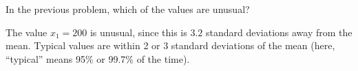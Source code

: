 \documentclass[answers,11pt]{exam}
\begin{document}
\begin{questions}

\question In the previous problem, which of the values are unusual?

\begin{solution}
The value $x_1 = 200$ is unusual, since this is $3.2$ standard deviations
away from the mean.  Typical values are within 2 or 3 standard deviations of
the mean (here, ``typical'' means 95\% or 99.7\% of the time).
\end{solution}


% 
% 
% 
% 
% 
% 
% 
% 
% 
% 
% 
% 
% 
% 


\end{questions}
\end{document}

